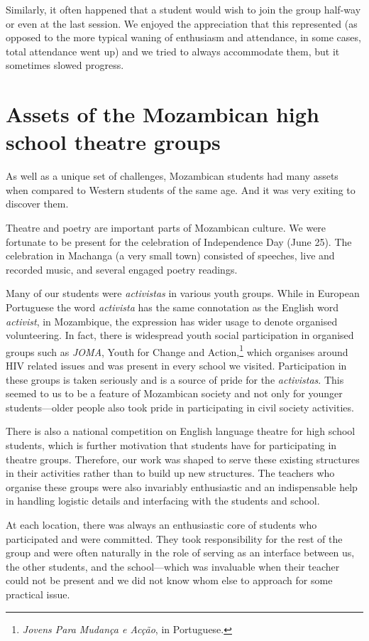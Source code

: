 \documentclass[article,twocolumn,twoside]{memoir}
\begin{document}
Similarly, it often happened that a student would wish to join the group
half-way or even at the last session. We enjoyed the appreciation that this
represented (as opposed to the more typical waning of enthusiasm and
attendance, in some cases, total attendance went up) and we tried to always
accommodate them, but it sometimes slowed progress.

\chapter{Assets of the Mozambican high school theatre groups}
As well as a unique set of challenges, Mozambican students had many assets when
compared to Western students of the same age. And it was very exiting to
discover them.

Theatre and poetry are important parts of Mozambican culture. We were fortunate
to be present for the celebration of Independence Day (June 25). The
celebration in Machanga (a very small town) consisted of speeches, live and
recorded music, and several engaged poetry readings.

Many of our students were \textit{activistas} in various youth groups. While in
European Portuguese the word \textit{activista} has the same connotation as the
English word \textit{activist}, in Mozambique, the expression has wider usage
to denote organised volunteering. In fact, there is widespread youth social
participation in organised groups such as \textit{JOMA}, Youth for Change and
Action,\footnote{\textit{Jovens Para Mudança e Acção}, in Portuguese.} which
organises around HIV related issues and was present in every school we visited.
Participation in these groups is taken seriously and is a source of pride for
the \textit{activistas}. This seemed to us to be a feature of Mozambican
society and not only for younger students---older people also took pride in
participating in civil society activities.

There is also a national competition on English language theatre for high
school students, which is further motivation that students have for
participating in theatre groups. Therefore, our work was shaped to serve these
existing structures in their activities rather than to build up new structures.
The teachers who organise these groups were also invariably enthusiastic and an
indispensable help in handling logistic details and interfacing with the
students and school.

At each location, there was always an enthusiastic core of students who
participated and were committed. They took responsibility for the rest of the
group and were often naturally in the role of serving as an interface between
us, the other students, and the school---which was invaluable when their
teacher could not be present and we did not know whom else to approach for some
practical issue.
\end{document}
